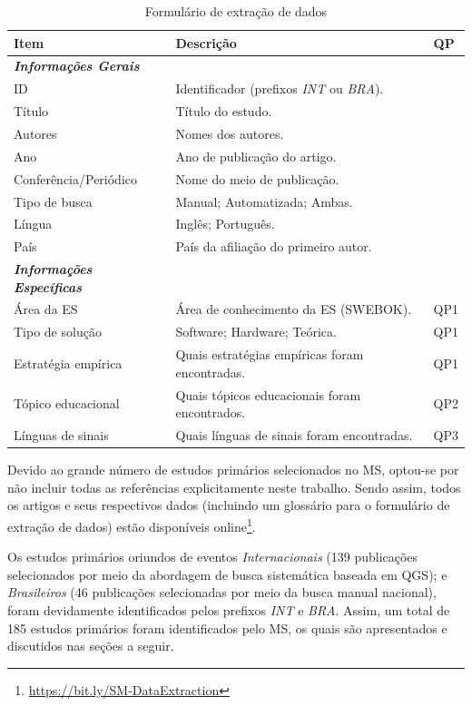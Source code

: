 \begin{table}[htbp]
\centering
\caption{Formulário de extração de dados}
\label{method:table:data-extraction}
\begin{tabular}{lll}
\hline
\textbf{Item} & \textbf{Descrição} & \textbf{QP} \\ \hline
\textit{\textbf{Informações Gerais}} & & \\ \hline
ID & Identificador (prefixos \textit{INT} ou \textit{BRA}). & \\
Título & Título do estudo. & \\
Autores & Nomes dos autores. & \\
Ano & Ano de publicação do artigo. & \\
Conferência/Periódico & Nome do meio de publicação. & \\
Tipo de busca & Manual; Automatizada; Ambas. & \\
Língua & Inglês; Português. & \\
País & País da afiliação do primeiro autor. & \\ \hline
\textit{\textbf{Informações Específicas}} & & \\ \hline
Área da ES & Área de conhecimento da ES (SWEBOK). & QP1 \\
Tipo de solução & Software; Hardware; Teórica. & QP1 \\
Estratégia empírica & Quais estratégias empíricas foram encontradas. & QP1 \\
Tópico educacional & Quais tópicos educacionais foram encontrados. & QP2 \\
Línguas de sinais & Quais línguas de sinais foram encontradas. & QP3 \\ \hline
\end{tabular}
\fautor
\end{table}

Devido ao grande número de estudos primários selecionados no MS, optou-se por não incluir todas as referências explicitamente neste trabalho. Sendo assim, todos os artigos e seus respectivos dados (incluindo um glossário para o formulário de extração de dados) estão disponíveis online\footnote{\url{https://bit.ly/SM-DataExtraction}}.

Os estudos primários oriundos de eventos \textit{Internacionais} (139 publicações selecionados por meio da abordagem de busca sistemática baseada em QGS); e \textit{Brasileiros} (46 publicações selecionadas por meio da busca manual nacional), foram devidamente identificados pelos prefixos \textit{INT} e \textit{BRA}. Assim, um total de 185 estudos primários foram identificados pelo MS, os quais são apresentados e discutidos nas seções a seguir.

